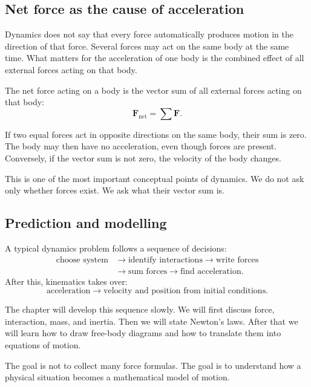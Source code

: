 \subsection{Net force as the cause of acceleration}

Dynamics does not say that every force automatically produces motion in the direction of that force. Several forces may act on the same body at the same time. What matters for the acceleration of one body is the combined effect of all external forces acting on that body.

\begin{definitionbox}
The net force acting on a body is the vector sum of all external forces acting on that body:
\[
\mathbf{F}_{\mathrm{net}}=\sum \mathbf{F}.
\]
\end{definitionbox}

If two equal forces act in opposite directions on the same body, their sum is zero. The body may then have no acceleration, even though forces are present. Conversely, if the vector sum is not zero, the velocity of the body changes.

This is one of the most important conceptual points of dynamics. We do not ask only whether forces exist. We ask what their vector sum is.

\subsection{Prediction and modelling}

A typical dynamics problem follows a sequence of decisions:
\[
\begin{aligned}
\text{choose system}
&\longrightarrow \text{identify interactions}
\longrightarrow \text{write forces} \\
&\longrightarrow \text{sum forces}
\longrightarrow \text{find acceleration}.
\end{aligned}
\]
After this, kinematics takes over:
\[
\text{acceleration}
\longrightarrow
\text{velocity and position from initial conditions}.
\]

The chapter will develop this sequence slowly. We will first discuss force, interaction, mass, and inertia. Then we will state Newton's laws. After that we will learn how to draw free-body diagrams and how to translate them into equations of motion.

The goal is not to collect many force formulas. The goal is to understand how a physical situation becomes a mathematical model of motion.
